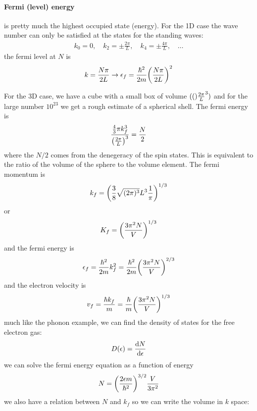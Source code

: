 \documentclass[../main.tex]{subfiles}
\begin{document}
\paragraph*{Fermi (level) energy} is pretty much the highest occupied state (energy). For the 1D 
case the wave number can only be satisfied at the states for the standing waves:
\begin{align*}
    k_0 = 0, \quad k_2 = \pm \frac{2\pi}{L}, \quad k_4 = \pm \frac{4\pi}{L}, \quad \dots
\end{align*}
the fermi level at $N$ is
\begin{align*}
    k = \frac{N\pi}{2L} \to \epsilon_f = \frac{\hbar^2}{2m} \qt(\frac{N\pi}{2L})^2
\end{align*}

For the 3D case, we have a cube with a small box of volume $(\qt\frac{2\pi}{L}^3)$ and for the
large number $10^{23}$ we get a rough estimate of a spherical shell. The fermi energy is
\begin{align*}
    \frac{\frac{4}{3} \pi k_f^3}{\qt(\frac{2\pi}{L})^3} = \frac{N}{2}
\end{align*}
where the $N/2$ comes from the denegeracy of the spin states. This is equivalent to the ratio of the
volume of the sphere to the volume element. The fermi momentum is
\begin{align*}
    k_f = \qt(\frac{3}{8} \sqrt{(2\pi)^3}{L^3} \frac{1}{\pi})^{1/3}
\end{align*}
or 
\begin{align*}
    K_f = \qt(\frac{3\pi^2N}{V})^{1/3}
\end{align*}
and the fermi energy is
\begin{align*}
    \epsilon_f = \frac{\hbar^2}{2m} k_f^2 
    = \frac{\hbar^2}{2m} \qt(\frac{3\pi^2N}{V})^{2/3}
\end{align*}
and the electron velocity is
\begin{align*}
    v_f = \frac{\hbar k_f}{m} = \frac{\hbar}{m} \qt(\frac{3\pi^2N}{V})^{1/3}
\end{align*}
much like the phonon example, we can find the density of states for the free electron gas:
\begin{align*}
    D(\epsilon) = \dv{N}{\epsilon}
\end{align*}
we can solve the fermi energy equation as a function of energy
\begin{align*}
    N = \qt(\frac{2\epsilon m}{\hbar^2})^{3/2} \frac{V}{3\pi^2}
\end{align*}
we also have a relation between $N$ and $k_f$ so we can write the volume in $k$ space:
\end{document}
